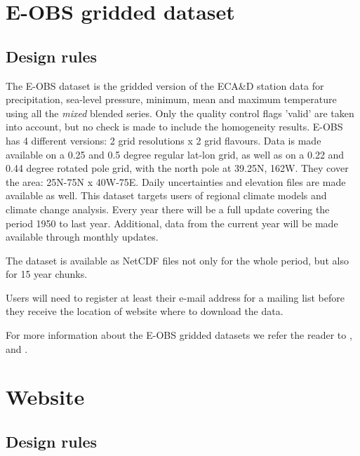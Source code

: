 \documentclass[a4paper,11pt]{article}
\begin{document}
\section{E-OBS gridded dataset}
\label{sec:eobs}
\subsection{Design rules}
\label{sec:eobsrules}

The E-OBS dataset is the gridded version of the ECA\&D station data
for precipitation, sea-level pressure, minimum, mean and maximum temperature using all the
\emph{mixed} blended series. Only the quality control flags 'valid' are taken into
account, but no check is made to include the homogeneity
results. E-OBS has 4 different versions: 2 grid resolutions x 2 grid
flavours. Data is made available on a 0.25 and 0.5 degree regular
lat-lon grid, as well as on a 0.22 and 0.44 degree rotated pole grid,
with the north pole at 39.25N, 162W. They cover the area: 25N-75N x
40W-75E. Daily uncertainties and elevation files are made available as
well. This dataset targets users of regional climate models and
climate change analysis. Every year there will be a full update
covering the period 1950 to last year. Additional, data from the
current year will be made available through monthly updates.

The dataset is available as NetCDF files not only for the whole
period, but also for 15 year chunks. 

Users will need to register at least their e-mail address for a
mailing list before they receive the location of website where to
download the data.

For more information about the E-OBS gridded datasets we refer the
reader to \citet{haylock}, \citet{hofstra} and \citet{vandenbesselaar:11}.


\section{Website}
\label{sec:website}
\subsection{Design rules}
\label{sec:websiterules}
\end{document}
